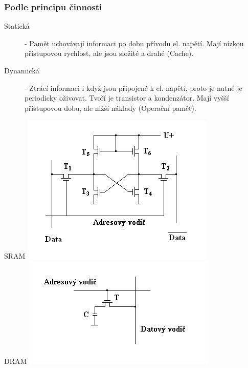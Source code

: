 \subsubsection{Podle principu činnosti}
\begin{description}
  \item[Statická] - Pamět uchovávají informaci po dobu přívodu el. napětí.
    Mají nízkou přístupovou rychlost, ale jsou složité a drahé (Cache).
  \item[Dynamická] - Ztrácí informaci i když jsou připojené k el. napětí, proto je nutné je periodicky oživovat.
    Tvoří je transistor a kondenzátor. Mají vyšší přístupovou dobu, ale nižší náklady (Operační paměť).
\end{description}
\begin{multicols}{2}\centering
  SRAM
  \includegraphics[width=\linewidth]{TVY-POS/Polovodicove-pameti/SRAM.png}
  \columnbreak\centering\\
  DRAM
  \includegraphics[width=\linewidth]{TVY-POS/Polovodicove-pameti/DRAM.png}
\end{multicols}
